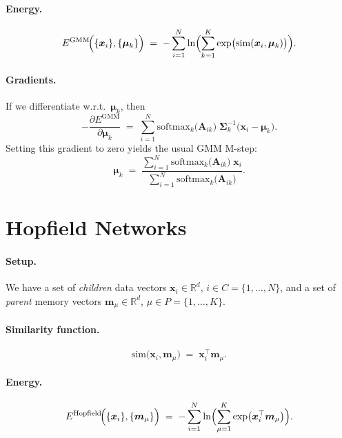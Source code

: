 \documentclass{article}
\begin{document}
\paragraph{Energy.}
\begin{equation}
E^{\mathrm{GMM}}\!\Bigl(\{\bm{x}_i\}, \{\bm{\mu}_k\}\Bigr)
\;=\;
-\sum_{i=1}^N
\ln \Bigl(\sum_{k=1}^K
\exp\bigl(\mathrm{sim}(\bm{x}_i,\bm{\mu}_k)\bigr)\Bigr).
\end{equation}

\paragraph{Gradients.}
If we differentiate w.r.t.\ \(\bm{\mu}_k\), then
\[
-\frac{\partial E^{\mathrm{GMM}}}{\partial \bm{\mu}_k}
\;=\;
\sum_{i=1}^N 
\text{softmax}_k\!\bigl(\bm{A}_{ik}\bigr)
\;\bm{\Sigma}_k^{-1}\bigl(\bm{x}_i - \bm{\mu}_k\bigr).
\]
Setting this gradient to zero yields the usual GMM M-step:
\[
\bm{\mu}_k
\;=\;
\frac{\sum_{i=1}^N 
\text{softmax}_k\!\bigl(\bm{A}_{ik}\bigr)\;\bm{x}_i}
     {\sum_{i=1}^N
     \text{softmax}_k\!\bigl(\bm{A}_{ik}\bigr)}.
\]

\section{Hopfield Networks}

\paragraph{Setup.}
We have a set of \emph{children} data vectors \(\bm{x}_i \in \mathbb{R}^d\), \(i\in C=\{1,\ldots,N\}\), and a set of \emph{parent} memory vectors \(\bm{m}_\mu \in \mathbb{R}^d\), \(\mu\in P=\{1,\ldots,K\}\).

\paragraph{Similarity function.}
\[
\mathrm{sim}\bigl(\bm{x}_i, \bm{m}_\mu\bigr)
\;=\;
\bm{x}_i^\top \bm{m}_\mu.
\]

\paragraph{Energy.}
\begin{equation}
E^{\mathrm{Hopfield}}\!\Bigl(\{\bm{x}_i\}, \{\bm{m}_\mu\}\Bigr)
\;=\;
-\sum_{i=1}^N
\ln \Bigl(\sum_{\mu=1}^K
\exp \bigl(\bm{x}_i^\top \bm{m}_\mu\bigr)\Bigr).
\end{equation}
\end{document}
